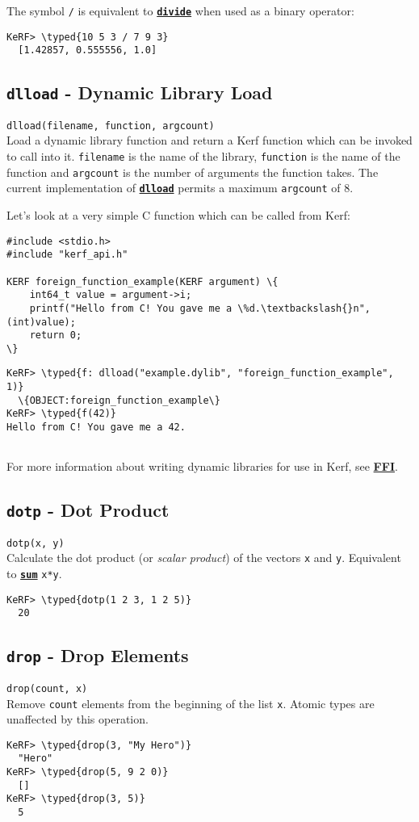 \documentclass{article}
\newcommand{\typed}[1]{\textcolor{TealBlue}{#1}}
\newcommand{\primdefu}[3]{\subsection{\texttt{#1} - #2}\label{prim:#3}}
\newcommand{\primu}[2]{\hyperref[prim:#2]{\textbf{\texttt{#1}}}}
\newcommand{\primdef}[2]{\primdefu{#1}{#2}{#1}}
\newcommand{\prim}[1]{\primu{#1}{#1}}
\begin{document}
The symbol \texttt{/} is equivalent to \prim{divide} when used as a binary operator:
\begin{Verbatim}
KeRF> \typed{10 5 3 / 7 9 3}
  [1.42857, 0.555556, 1.0]
\end{Verbatim}

\pagebreak
\primdef{dlload}{Dynamic Library Load}
\texttt{dlload(filename, function, argcount)}\\

Load a dynamic library function and return a Kerf function which can be invoked to call into it. \texttt{filename} is the name of the library, \texttt{function} is the name of the function and \texttt{argcount} is the number of arguments the function takes. The current implementation of \prim{dlload} permits a maximum \texttt{argcount} of 8.

\vspace{0.5cm} 

Let's look at a very simple C function which can be called from Kerf:
\begin{Verbatim}
#include <stdio.h>
#include "kerf_api.h"

KERF foreign_function_example(KERF argument) \{
	int64_t value = argument->i;
	printf("Hello from C! You gave me a \%d.\textbackslash{}n", (int)value);
	return 0;
\}
\end{Verbatim}
\begin{Verbatim}
KeRF> \typed{f: dlload("example.dylib", "foreign_function_example", 1)}
  \{OBJECT:foreign_function_example\}
KeRF> \typed{f(42)}
Hello from C! You gave me a 42.
  
\end{Verbatim}

For more information about writing dynamic libraries for use in Kerf, see \hyperref[sec:ffi]{\textbf{FFI}}.

\primdef{dotp}{Dot Product}
\texttt{dotp(x, y)}\\

Calculate the dot product (or \emph{scalar product}) of the vectors \texttt{x} and \texttt{y}. Equivalent to \prim{sum} \texttt{x*y}.
\begin{Verbatim}
KeRF> \typed{dotp(1 2 3, 1 2 5)}
  20
\end{Verbatim}

\primdef{drop}{Drop Elements}
\texttt{drop(count, x)}\\

Remove \texttt{count} elements from the beginning of the list \texttt{x}. Atomic types are unaffected by this operation.
\begin{Verbatim}
KeRF> \typed{drop(3, "My Hero")}
  "Hero"
KeRF> \typed{drop(5, 9 2 0)}
  []
KeRF> \typed{drop(3, 5)}
  5
\end{Verbatim}
\end{document}
